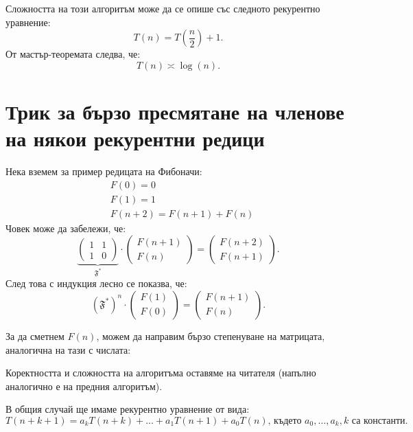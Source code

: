 Сложността на този алгоритъм може да се опише със следното рекурентно уравнение:
\[
    T(n) = T(\frac{n}{2}) + 1.
\]
От мастър-теоремата следва, че:
\[
    T(n) \asymp \log(n).
\]

\section{Трик за бързо пресмятане на членове на някои рекурентни редици}

Нека вземем за пример редицата на Фибоначи:
\begin{align*}
     & F(0) = 0                   \\
     & F(1) = 1                   \\
     & F(n + 2) = F(n + 1) + F(n)
\end{align*}
Човек може да забележи, че:
\[
    \underbrace{\begin{pmatrix}
            1 & 1 \\
            1 & 0
        \end{pmatrix}}_{\mathfrak{F}^*}
    \cdot
    \begin{pmatrix}
        F(n + 1) \\
        F(n)
    \end{pmatrix}
    =
    \begin{pmatrix}
        F(n + 2) \\
        F(n + 1)
    \end{pmatrix}.
\]
След това с индукция лесно се показва, че:
\[
    (\mathfrak{F}^*)^n
    \cdot
    \begin{pmatrix}
        F(1) \\
        F(0)
    \end{pmatrix}
    =
    \begin{pmatrix}
        F(n + 1) \\
        F(n)
    \end{pmatrix}.
\]

\newpage

За да сметнем $F(n)$, можем да направим бързо степенуване на матрицата, аналогична на тази с числата:


Коректността и сложността на алгоритъма оставяме на читателя (напълно аналогично е на предния алгоритъм).

В общия случай ще имаме рекурентно уравнение от вида:
\[
    T(n + k + 1) = a_k T(n + k) + \dots + a_1 T(n + 1) + a_0 T(n) \text{, където } a_0, \dots, a_k, k \text{ са константи}.
\]

